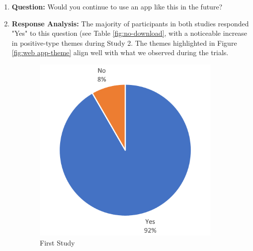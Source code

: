 \documentclass[thesis]{fputhesis}
\begin{document}
\begin{body}
\pagebreak
\begin{enumerate}
    \item[] \textbf{Question: } Would you continue to use an app like this in the future?
    \item[] \textbf{Response Analysis: } The majority of participants in both studies responded "Yes" to this question (see Table \ref{fig:no-download}, with a noticeable increase in positive-type themes during Study 2. The themes highlighted in Figure \ref{fig:web app-theme} align well with what we observed during the trials. 
\end{enumerate}

\begin{figure}[h]
    \centering
    \begin{subfigure}[]{.45\textwidth}
        \centering
        \includegraphics[width=\textwidth]{Images/future use study 1.png}
        \caption{First Study}
        \label{fig:future1}
    \end{subfigure}
    \begin{subfigure}[]{.45\textwidth}
        \centering

\end{subfigure}
\end{figure}
\end{body}
\end{document}
